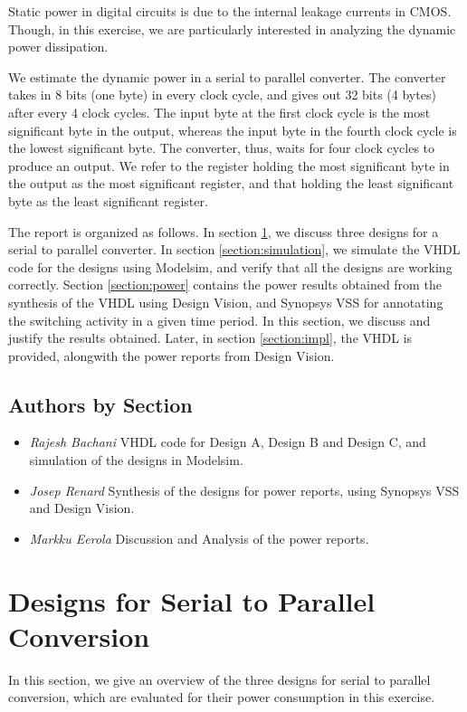 \documentclass[11pt,a4paper]{article}
\begin{document}
Static power in digital circuits is due to the internal leakage currents in CMOS. Though, in this exercise, we are particularly interested in analyzing the dynamic power dissipation.

We estimate the dynamic power in a serial to parallel converter. The converter takes in 8 bits (one byte) in every clock cycle, and gives out 32 bits (4 bytes) after every 4 clock cycles. The input byte at the first clock cycle is the most significant byte in the output, whereas the input byte in the fourth clock cycle is the lowest significant byte. The converter, thus, waits for four clock cycles to produce an output. We refer to the register holding the most significant byte in the output as the most significant register, and that holding the least significant byte as the least significant register.

The report is organized as follows. In section \ref{section:designs}, we discuss three designs for a serial to parallel converter. In section \ref{section:simulation}, we simulate the VHDL code for the designs using Modelsim, and verify that all the designs are working correctly. Section \ref{section:power} contains the power results obtained from the synthesis of the VHDL using Design Vision, and Synopsys VSS for annotating the switching activity in a given time period. In this section, we discuss and justify the results obtained. Later, in section \ref{section:impl}, the VHDL is provided, alongwith the power reports from Design Vision. 

\subsection{Authors by Section}
\begin{itemize}
\item \textit{Rajesh Bachani} VHDL code for Design A, Design B and Design C, and simulation of the designs in Modelsim.
\item \textit{Josep Renard} Synthesis of the designs for power reports, using Synopsys VSS and Design Vision.
\item \textit{Markku Eerola} Discussion and Analysis of the power reports.
\end{itemize}

\newpage
\section{Designs for Serial to Parallel Conversion}
\label{section:designs}
In this section, we give an overview of the three designs for serial to parallel conversion, which are evaluated for their power consumption in this exercise.
\end{document}
